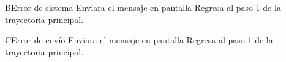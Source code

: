 	\begin{UCtrayectoriaA}{B}{Error de sistema}
		\UCpaso[\UCsist] Enviara el mensaje en pantalla 
		\UCpaso[\UCsist] Regresa al paso 1 de la trayectoria principal.
	\end{UCtrayectoriaA}
	
	\begin{UCtrayectoriaA}{C}{Error de envío}
		\UCpaso[\UCsist] Enviara el mensaje en pantalla 
		\UCpaso[\UCsist] Regresa al paso 1 de la trayectoria principal.
	\end{UCtrayectoriaA}			
		
